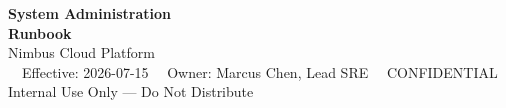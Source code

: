 \documentclass[11pt,a4paper]{article}
\begin{document}
\begin{titlebanner}
  \centering
  \color{white}
  {\huge\bfseries System Administration\\[2pt] Runbook}\\[6pt]
  {\LARGE Nimbus Cloud Platform}\\[10pt]
  {\footnotesize\faCalendar\ \ Effective: 2026-07-15 \hspace{18pt} \faUser\ \ Owner: Marcus Chen, Lead SRE \hspace{18pt} \faLock\ \ CONFIDENTIAL}\\[2pt]
  {\footnotesize\textcolor{green!35!white}{Internal Use Only --- Do Not Distribute}}
\end{titlebanner}







\end{document}
